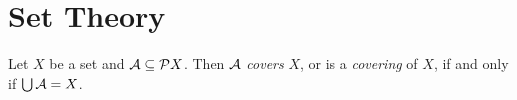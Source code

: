 \section{Set Theory}

\begin{definition}[Cover]
    Let $X$ be a set and $\AA \subseteq \pow X$. Then $\AA$ \emph{covers} $X$,
    or is a \emph{covering} of $X$, if and only if $\bigcup \AA = X$.
\end{definition}
